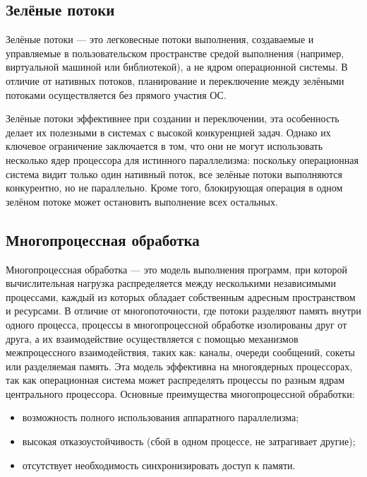 \subsection{Зелёные потоки}

Зелёные потоки ---  это легковесные потоки выполнения, создаваемые и управляемые в пользовательском пространстве средой выполнения (например, виртуальной машиной или библиотекой), а не ядром операционной системы. В отличие от нативных потоков, планирование и переключение между зелёными потоками осуществляется без прямого участия ОС.

Зелёные потоки эффективнее при создании и переключении, эта особенность делает их полезными в системах с высокой конкуренцией задач. Однако их ключевое ограничение заключается в том, что они не могут использовать несколько ядер процессора для истинного параллелизма: поскольку операционная система видит только один нативный поток, все зелёные потоки выполняются конкурентно, но не параллельно.  Кроме того, блокирующая операция в одном зелёном потоке может остановить выполнение всех остальных.

\subsection{Многопроцессная обработка}

Многопроцессная обработка --- это модель выполнения программ, при которой вычислительная нагрузка распределяется между несколькими независимыми процессами, каждый из которых обладает собственным адресным пространством и ресурсами. В отличие от многопоточности, где потоки разделяют память внутри одного процесса, процессы в многопроцессной обработке изолированы друг от друга, а их взаимодействие осуществляется с помощью механизмов межпроцессного взаимодействия, таких как: каналы, очереди сообщений, сокеты или разделяемая память. Эта модель эффективна на многоядерных процессорах, так как операционная система может распределять процессы по разным ядрам центрального процессора. Основные преимущества многопроцессной обработки:
\begin{itemize}
	\item возможность полного использования аппаратного параллелизма;
	\item высокая отказоустойчивость (сбой в одном процессе, не затрагивает другие);
	\item отсутствует необходимость синхронизировать доступ к памяти.
\end{itemize}

